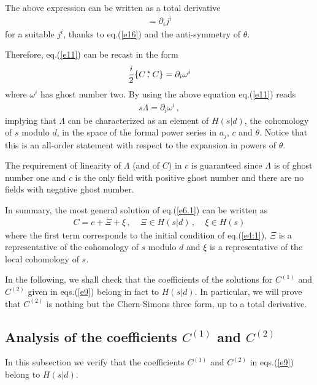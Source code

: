 \documentclass[a4paper,12pt]{article}
\newcommand{\staranticomm}[2]{\{ #1 \, ,^{\!\!\star} #2 \}}
\begin{document}
The above expression can be written as a total derivative
%
\begin{eqnarray}
[ f(x) \, ,^{\!\!\star} g(x) ] = 
\partial_i j^i 
\label{e17}
\end{eqnarray}
%
for a suitable $j^i$, thanks to eq.(\ref{e16}) and the
 anti-symmetry of $\theta$.

Therefore, eq.(\ref{e11}) can be recast in the form
%
\begin{eqnarray}
{i \over 2} \staranticomm{C}{C} = \partial_i \omega^i 
\label{e18}
\end{eqnarray}
%
where $\omega^i$ has ghost number two.
%
By using the above equation eq.(\ref{e11}) reads
%
\begin{eqnarray}
s \Lambda = \partial_i \omega^i \, ,
\label{e19}
\end{eqnarray}
%
implying that $\Lambda$ can be characterized as an element of $H(s|d)$,
 the cohomology of $s$ modulo $d$, in the space of the formal
 power series in $a_j$, $c$ and $\theta$. 
Notice that this is an all-order statement with respect to the expansion in
 powers of $\theta$.

The requirement of linearity of $\Lambda$ (and of $C$) in $c$ is 
 guaranteed since $\Lambda$ is of ghost number one and $c$ is the only
 field with positive ghost number and there are no fields with negative
 ghost number.

In summary, the most general solution of eq.(\ref{e6.1}) can be written as
%
\begin{eqnarray}
C = c + \Xi + \xi \, , ~~~~~ \Xi \in H(s|d) \, , ~~~~~ \xi \in H(s) 
\label{e20}
\end{eqnarray}
%
where the first term corresponds to the initial condition of 
 eq.(\ref{e4:1}), $\Xi$ is a representative of the cohomology
 of $s$ modulo $d$ and $\xi$ is a representative of the local cohomology of
 $s$.

In the following, we shall check that the coefficients of the solutions for 
 $C^{(1)}$ and $C^{(2)}$ given in eqs.(\ref{e9}) belong in fact to $H(s|d)$.
In particular, we will prove that $C^{(2)}$ is nothing but the Chern-Simons
 three form, up to a total derivative. 

\subsection{Analysis of the coefficients $C^{(1)}$ and $C^{(2)}$}

In this subsection we verify that the coefficients
 $C^{(1)}$ and $C^{(2)}$ in eqs.(\ref{e9}) belong to $H(s|d)$.
\end{document}
